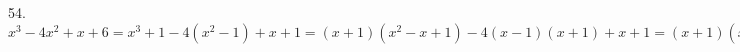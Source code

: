 54. $x^3-4x^2+x+6=x^3+1-4(x^2-1)+x+1=(x+1)(x^2-x+1)-4(x-1)(x+1)+x+1=(x+1)(x^2-x+1-4x+4+1)=(x+1)(x^2-5x+6)=(x+1)(x-2)(x-3).$\\
